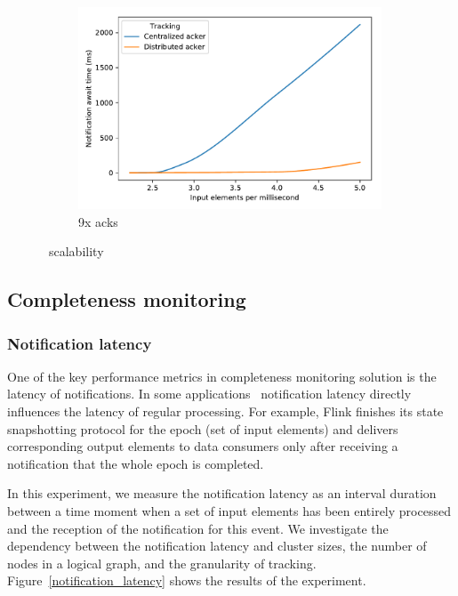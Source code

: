 \begin{figure}[t!]
\begin{subfigure}[b]{0.32\textwidth}
            \includegraphics[width=0.99\textwidth]{pics/scalability_09x.pdf}
            \caption{9x acks}
            \label{9x_acks}
	\end{subfigure}
    \caption{\tracker\ scalability}
    \label{notification_scalability}
\end{figure}

\subsection{Completeness monitoring} \label{completeness}

\subsubsection{Notification latency}

One of the key performance metrics in completeness monitoring solution is the latency of notifications. In some applications~\cite{Carbone:2017:SMA:3137765.3137777, we2018adbis} notification latency directly influences the latency of regular processing. For example, Flink finishes its state snapshotting protocol for the epoch (set of input elements) and delivers corresponding output elements to data consumers only after receiving a notification that the whole epoch is completed. 

In this experiment, we measure the notification latency as an interval duration between a time moment when a set of input elements has been entirely processed and the reception of the notification for this event. We investigate the dependency between the notification latency and cluster sizes, the number of nodes in a logical graph, and the granularity of tracking. Figure~\ref{notification_latency} shows the results of the experiment. 


